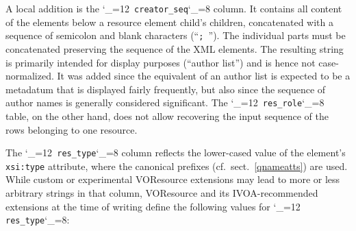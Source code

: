 \documentclass[11pt,a4paper]{ivoa}
\makeatletter
\def\rtent#1{\texttt{\color{rtcolor}\verb|#1|}}
\def\makeunderscoreletter{\catcode`\_=12}
\def\makeunderscoresubscript{\catcode`\_=8}
\def\rtent{\makeunderscoreletter\relax\rt@nt}
\def\rt@nt#1{\texttt{\color{rtcolor} #1}\makeunderscoresubscript{}}
\makeatother
\begin{document}
A local addition is the \rtent{creator_seq} column.  It contains
all content of the  elements below a resource element
 child's  children, concatenated with a
sequence of semicolon and blank characters (``\mbox{\texttt{; }}''). The
individual parts must be concatenated preserving the sequence of the XML
elements.  The resulting string is primarily intended for display
purposes (``author list'') and is hence not case-normalized.  It was
added since the equivalent of an author list is expected to be a
metadatum that is displayed fairly frequently, but also since the
sequence of author names is generally considered significant.  The
\rtent{res_role} table, on the other hand, does not allow recovering
the input sequence of the rows belonging to one resource.

The \rtent{res_type} column reflects the lower-cased value of
the  element's \texttt{xsi:type} attribute,
where the canonical prefixes (cf.~sect.~\ref{qnameatts})
are used.  While custom or experimental
VOResource extensions may lead to more or less arbitrary strings in that
column, VOResource and its IVOA-recommended extensions at the time of
writing define the following values for \rtent{res_type}:
\end{document}
